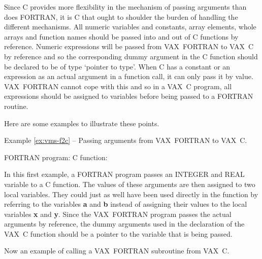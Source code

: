 Since C provides more flexibility in the mechanism of passing arguments than
does FORTRAN, it is C that ought to shoulder the burden of handling the
different mechanisms. All numeric variables and constants, array elements,
whole arrays and function names should be passed into and out of C functions by
reference. Numeric expressions will be passed from VAX~FORTRAN to VAX~C by
reference and so the corresponding dummy argument in the C function should be
declared to be of type `pointer to type'. When C has a constant or an
expression as an actual argument in a function call, it can only pass it by
value. VAX~FORTRAN cannot cope with this and so in a VAX~C program, all
expressions should be assigned to variables before being passed to a FORTRAN
routine.

Here are some examples to illustrate these points. 

\label{ex:vms-f2c}
\begin{center}
Example \ref{ex:vms-f2c} -- Passing arguments from VAX~FORTRAN to VAX~C.
\end{center}
\nopagebreak[4]
FORTRAN program:
\pagebreak[1]
C function:

In this first example, a FORTRAN program passes an INTEGER and REAL variable to
a C function. The values of these arguments are then assigned to two local
variables. They could just as well have been used directly in the function by
referring to the variables  {\tt *}{\bf a} and {\tt *}{\bf b} instead of
assigning their values to the local variables {\bf x} and {\bf y}. Since the
VAX~FORTRAN program passes the actual arguments by reference, the dummy arguments
used in the declaration of the VAX~C function should be a pointer to the variable
that is being passed.

Now an example of calling a VAX~FORTRAN subroutine from VAX~C.

